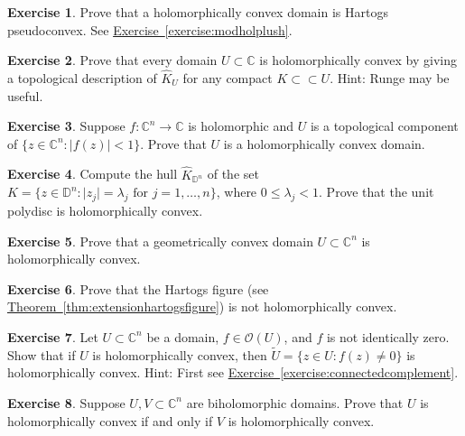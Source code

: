 \documentclass[12pt,openany]{book}
\newcommand{\sabs}[1]{\lvert {#1} \rvert}
\newcommand{\C}{{\mathbb{C}}}
\newcommand{\D}{{\mathbb{D}}}
\newcommand{\sO}{{\mathscr{O}}}
\theoremstyle{plain}
\theoremstyle{remark}
\theoremstyle{definition}
\newenvironment{exbox}{%
    \def\FrameCommand{\vrule width 1pt \relax\hspace{10pt}}%
    \MakeFramed{\advance\hsize-\width\FrameRestore}%
}{%
    \endMakeFramed
}
\theoremstyle{exercise}
\newtheorem{exercise}{Exercise}[section]
\theoremstyle{example}
\newcommand{\exerciseref}[1]{\hyperref[#1]{Exercise~\ref*{#1}}}
\newcommand{\thmref}[1]{\hyperref[#1]{Theorem~\ref*{#1}}}
\begin{document}
\begin{exbox}
\begin{exercise}
Prove that a holomorphically convex domain is Hartogs pseudoconvex.
See \exerciseref{exercise:modholplush}.
\end{exercise}

\begin{exercise}
Prove that every domain $U \subset \C$ is holomorphically convex by 
giving a topological description of $\widehat{K}_U$ for any
compact $K \subset \subset U$.  Hint: Runge may be useful.
\end{exercise}

\begin{exercise}
Suppose $f \colon \C^n \to \C$ is holomorphic and $U$ is a topological
component of $\bigl\{ z \in \C^n : \sabs{f(z)} < 1 \bigr\}$.  Prove
that $U$ is a holomorphically convex domain.
\end{exercise}

\begin{exercise}
Compute the hull
$\widehat{K}_{\D^n}$ of the set $K = \bigl\{ z \in \D^n : \sabs{z_j} =
\lambda_j \text{ for } j=1,\ldots,n \bigr\}$, where $0 \leq \lambda_j < 1$.
Prove that the unit polydisc is holomorphically convex.
\end{exercise}

\begin{exercise}
Prove that a geometrically convex domain $U \subset \C^n$
is holomorphically convex.
\end{exercise}

\begin{exercise}
Prove that the Hartogs figure (see \thmref{thm:extensionhartogsfigure})
is not holomorphically convex.
\end{exercise}

\begin{exercise}
Let $U \subset \C^n$ be a domain, $f \in \sO(U)$, and $f$ is not identically
zero.  Show that if
$U$ is holomorphically convex, then
$\widetilde{U} = \bigl\{ z \in U : f(z) \not= 0 \bigr\}$
is holomorphically convex.  
Hint: First see \exerciseref{exercise:connectedcomplement}.
\end{exercise}

\begin{exercise} \label{exercise:biholholconvex}
Suppose $U,V \subset \C^n$ are biholomorphic domains.
Prove that $U$ is holomorphically convex if and only if $V$ is
holomorphically convex.
\end{exercise}


\end{exbox}
\end{document}
